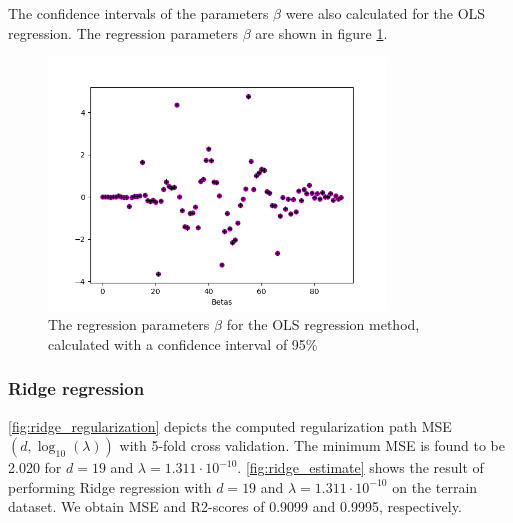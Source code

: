 \documentclass[../main.tex]{subfiles}
\begin{document}
The confidence intervals of the parameters $\beta$ were also calculated for the OLS regression. The regression parameters $\beta$ are shown in figure \ref{fig:OLS_CI}.

\begin{figure}[H]
 \centering
    \includegraphics[width=0.8\textwidth]{../assets/terrain_OLS_CI_new.png} 
    \caption{The regression parameters $\beta$ for the OLS regression method, calculated with a confidence interval of 95\%}
    \label{fig:OLS_CI}
\end{figure}


\subsubsection{Ridge regression}
\autoref{fig:ridge_regularization} depicts the computed regularization path MSE$(d,\log_{10}(\lambda))$ with 5-fold cross validation. The minimum MSE is found to be 2.020 for \ensuremath{d=19} and \ensuremath{\lambda=1.311\cdot 10^{-10}}. \autoref{fig:ridge_estimate} shows the result of performing Ridge regression with $d=19$ and $\lambda=1.311\cdot 10^{-10}$ on the terrain dataset. We obtain MSE and R2-scores of 0.9099 and 0.9995, respectively. 
\end{document}

